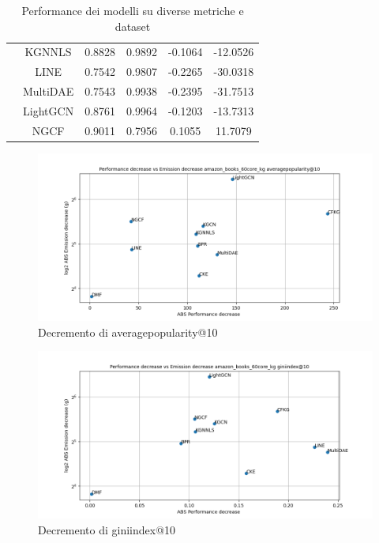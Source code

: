 \begin{table}[H]
{\begin{tabular}{|c|c|c|c|c|c|}
                                        & KGNNLS & 0.8828 & 0.9892 & -0.1064 & -12.0526 \\ \cline{2-6} 
                                        & LINE & 0.7542 & 0.9807 & -0.2265 & -30.0318 \\ \cline{2-6} 
                                        & MultiDAE & 0.7543 & 0.9938 & -0.2395 & -31.7513 \\ \cline{2-6} 
                                        & LightGCN & 0.8761 & 0.9964 & -0.1203 & -13.7313 \\ \cline{2-6} 
                                        & NGCF & 0.9011 & 0.7956 & 0.1055 & 11.7079 \\ \cline{2-6} 
        \hline
    \end{tabular}
    }
    \caption{Performance dei modelli su diverse metriche e dataset}
\end{table}


\begin{figure}[H]
    \centering
     \includegraphics[width=\textwidth]{images/decrement_averagepopularity@10_amazon_books_60core_kg.png}
    \caption{Decremento di averagepopularity@10}
\end{figure}

\begin{figure}[H]
    \centering
     \includegraphics[width=\textwidth]{images/decrement_giniindex@10_amazon_books_60core_kg.png}
    \caption{Decremento di giniindex@10}
\end{figure}

